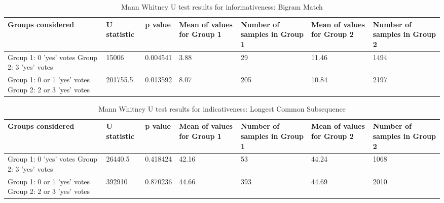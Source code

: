\begin{table}[!htbp]
\caption{Mann Whitney U test results for informativeness: Bigram Match}
\centering
\label{tab:bicorr2}
\begin{tabular}{|p{}|p{}|p{}|p{}|p{}|p{}|p{}|}
\hline
Groups considered    & U statistic & p value & Mean of values for Group 1 & Number of samples in Group 1 & Mean of values for Group 2 & Number of samples in Group 2\\ \hline
Group 1: 0 'yes' votes \newline Group 2: 3 'yes' votes & 15006 & 0.004541 & 3.88 & 29 & 11.46 & 1494  \\ \hline
Group 1: 0 or 1 'yes' votes \newline Group 2: 2 or 3 'yes' votes & 201755.5 & 0.013592 & 8.07 & 205 & 10.84 & 2197 \\ \hline
\end{tabular}
\end{table}



\begin{table}[!htbp]
\caption{Mann Whitney U test results for indicativeness: Longest Common Subsequence}
\centering
\label{tab:lcscorr1}
\begin{tabular}{|p{}|p{}|p{}|p{}|p{}|p{}|p{}|}
\hline
Groups considered    & U statistic & p value & Mean of values for Group 1 & Number of samples in Group 1 & Mean of values for Group 2 & Number of samples in Group 2\\ \hline
Group 1: 0 'yes' votes \newline Group 2: 3 'yes' votes &  26440.5  &  0.418424  &  42.16  & 53 &  44.24 &   1068  \\ \hline
Group 1: 0 or 1 'yes' votes \newline Group 2: 2 or 3 'yes' votes  &  392910     & 0.870236 &  44.66  & 393 & 44.69 & 2010 \\ \hline
\end{tabular}
\end{table}


